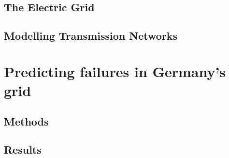 \documentclass{report}
\theoremstyle{definition}
\theoremstyle{remark}
\begin{document}
\chapter{The Electric Grid}\label{chap:grid}


\chapter{Modelling Transmission Networks}\label{chap:model}


\part{Predicting failures in Germany's grid}\label{part:sim}

\chapter{Methods}\label{chap:methods}


\chapter{Results}\label{chap:results}






\printindex
\end{document}
